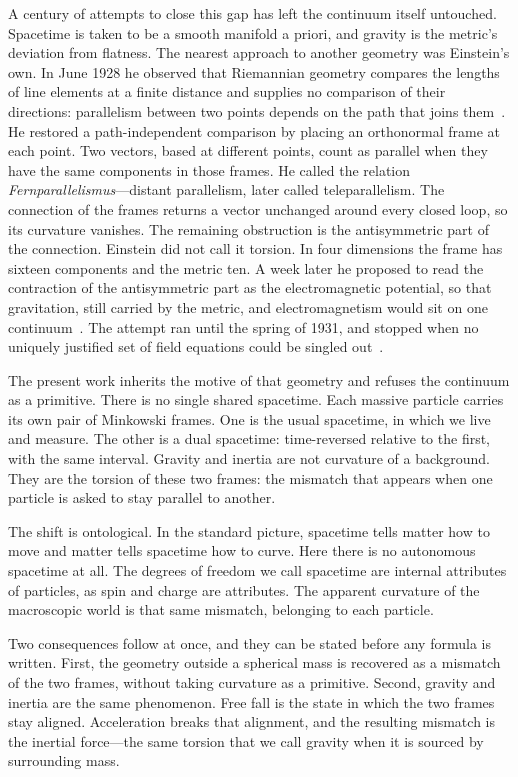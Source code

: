 \documentclass[a4paper]{article}
\begin{document}
A century of attempts to close this gap has left the continuum itself untouched. Spacetime is taken to be a smooth manifold a priori, and gravity is the metric's deviation from flatness. The nearest approach to another geometry was Einstein's own. In June 1928 he observed that Riemannian geometry compares the lengths of line elements at a finite distance and supplies no comparison of their directions: parallelism between two points depends on the path that joins them~\cite{einstein1928fern}. He restored a path-independent comparison by placing an orthonormal frame at each point. Two vectors, based at different points, count as parallel when they have the same components in those frames. He called the relation \emph{Fernparallelismus}---distant parallelism, later called teleparallelism. The connection of the frames returns a vector unchanged around every closed loop, so its curvature vanishes. The remaining obstruction is the antisymmetric part of the connection. Einstein did not call it torsion. In four dimensions the frame has sixteen components and the metric ten. A week later he proposed to read the contraction of the antisymmetric part as the electromagnetic potential, so that gravitation, still carried by the metric, and electromagnetism would sit on one continuum~\cite{einstein1928unified}. The attempt ran until the spring of 1931, and stopped when no uniquely justified set of field equations could be singled out~\cite{sauer2006}.

The present work inherits the motive of that geometry and refuses the continuum as a primitive. There is no single shared spacetime. Each massive particle carries its own pair of Minkowski frames. One is the usual spacetime, in which we live and measure. The other is a dual spacetime: time-reversed relative to the first, with the same interval. Gravity and inertia are not curvature of a background. They are the torsion of these two frames: the mismatch that appears when one particle is asked to stay parallel to another.

The shift is ontological. In the standard picture, spacetime tells matter how to move and matter tells spacetime how to curve. Here there is no autonomous spacetime at all. The degrees of freedom we call spacetime are internal attributes of particles, as spin and charge are attributes. The apparent curvature of the macroscopic world is that same mismatch, belonging to each particle.

Two consequences follow at once, and they can be stated before any formula is written. First, the geometry outside a spherical mass is recovered as a mismatch of the two frames, without taking curvature as a primitive. Second, gravity and inertia are the same phenomenon. Free fall is the state in which the two frames stay aligned. Acceleration breaks that alignment, and the resulting mismatch is the inertial force---the same torsion that we call gravity when it is sourced by surrounding mass.
\end{document}
